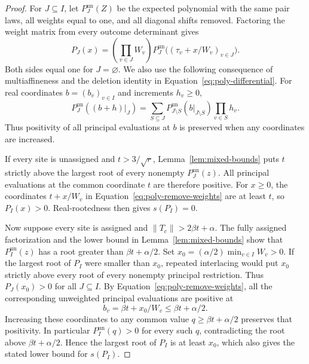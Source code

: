 \begin{proof}
For \(J\subseteq I\), let \(P_J^{\mathrm{un}}(Z)\) be the expected
polynomial with the same pair laws, all weights equal to one, and all
diagonal shifts removed. Factoring the weight matrix from every outcome
determinant gives
\begin{equation}\label{eq:poly-remove-weights}
 P_J(x)=\left(\prod_{v\in J}W_v\right)
 P_J^{\mathrm{un}}\bigl((\tau_v+x/W_v)_{v\in J}\bigr).
\end{equation}
Both sides equal one for \(J=\varnothing\).
We also use the following consequence of multiaffineness and the deletion
identity in Equation~\eqref{eq:poly-differential}. For real coordinates
\(b=(b_v)_{v\in I}\) and increments \(h_v\geq0\),
\[
 P_J^{\mathrm{un}}((b+h)|_J)
 =\sum_{S\subseteq J}
 P_{J\setminus S}^{\mathrm{un}}(b|_{J\setminus S})
       \prod_{v\in S}h_v.
\]
Thus positivity of all principal evaluations at \(b\) is preserved
when any coordinates are increased.

If every site is unassigned and \(t>3/\sqrt r\),
Lemma~\ref{lem:mixed-bounds} puts \(t\) strictly above the largest root
of every nonempty \(P_J^{\mathrm{un}}(z)\). All principal evaluations
at the common coordinate \(t\) are therefore positive. For \(x\geq0\),
the coordinates \(t+x/W_v\) in Equation~\eqref{eq:poly-remove-weights}
are at least \(t\), so \(P_I(x)>0\). Real-rootedness then gives
\(s(P_I)=0\).

Now suppose every site is assigned and \(\|T_c\|>2\beta t+\alpha\).
The fully assigned factorization and the lower bound in
Lemma~\ref{lem:mixed-bounds} show that \(P_I^{\mathrm{un}}(z)\) has a
root greater than \(\beta t+\alpha/2\). Set
\(x_0=(\alpha/2)\min_{v\in I}W_v>0\). If the largest root of \(P_I\)
were smaller than \(x_0\), repeated interlacing would put \(x_0\)
strictly above every root of every nonempty principal restriction.
Thus \(P_J(x_0)>0\) for all \(J\subseteq I\). By
Equation~\eqref{eq:poly-remove-weights}, all the corresponding
unweighted principal evaluations are positive at
\[
 b_v=\beta t+x_0/W_v\leq\beta t+\alpha/2.
\]
Increasing these coordinates to any common value
\(q\geq\beta t+\alpha/2\) preserves that positivity. In particular
\(P_I^{\mathrm{un}}(q)>0\) for every such \(q\), contradicting the root
above \(\beta t+\alpha/2\). Hence the largest root of \(P_I\) is at
least \(x_0\), which also gives the stated lower bound for \(s(P_I)\).
\end{proof}

